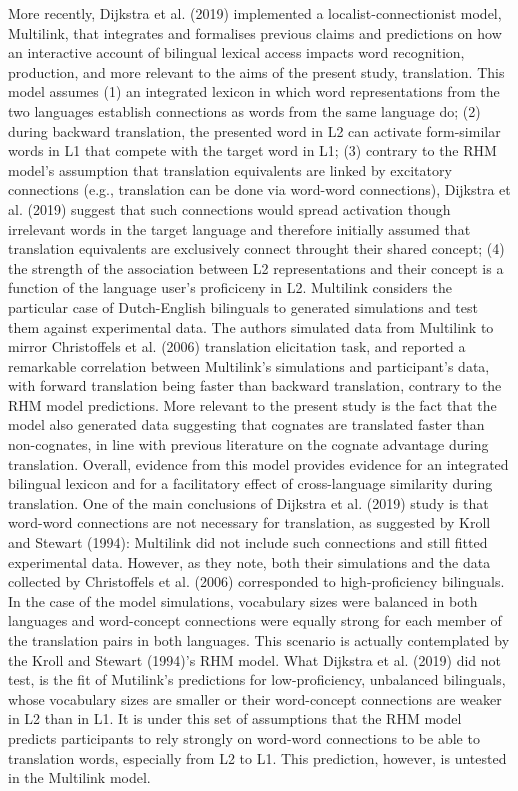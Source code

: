 \documentclass[
  english,
  man,floatsintext]{apa6}
\begin{document}
More recently, Dijkstra et al. (2019) implemented a localist-connectionist model, Multilink, that integrates and formalises previous claims and predictions on how an interactive account of bilingual lexical access impacts word recognition, production, and more relevant to the aims of the present study, translation. This model assumes (1) an integrated lexicon in which word representations from the two languages establish connections as words from the same language do; (2) during backward translation, the presented word in L2 can activate form-similar words in L1 that compete with the target word in L1; (3) contrary to the RHM model's assumption that translation equivalents are linked by excitatory connections (e.g., translation can be done via word-word connections), Dijkstra et al. (2019) suggest that such connections would spread activation though irrelevant words in the target language and therefore initially assumed that translation equivalents are exclusively connect throught their shared concept; (4) the strength of the association between L2 representations and their concept is a function of the language user's proficiceny in L2. Multilink considers the particular case of Dutch-English bilinguals to generated simulations and test them against experimental data. The authors simulated data from Multilink to mirror Christoffels et al. (2006) translation elicitation task, and reported a remarkable correlation between Multilink's simulations and participant's data, with forward translation being faster than backward translation, contrary to the RHM model predictions. More relevant to the present study is the fact that the model also generated data suggesting that cognates are translated faster than non-cognates, in line with previous literature on the cognate advantage during translation. Overall, evidence from this model provides evidence for an integrated bilingual lexicon and for a facilitatory effect of cross-language similarity during translation. One of the main conclusions of Dijkstra et al. (2019) study is that word-word connections are not necessary for translation, as suggested by Kroll and Stewart (1994): Multilink did not include such connections and still fitted experimental data. However, as they note, both their simulations and the data collected by Christoffels et al. (2006) corresponded to high-proficiency bilinguals. In the case of the model simulations, vocabulary sizes were balanced in both languages and word-concept connections were equally strong for each member of the translation pairs in both languages. This scenario is actually contemplated by the Kroll and Stewart (1994)'s RHM model. What Dijkstra et al. (2019) did not test, is the fit of Mutilink's predictions for low-proficiency, unbalanced bilinguals, whose vocabulary sizes are smaller or their word-concept connections are weaker in L2 than in L1. It is under this set of assumptions that the RHM model predicts participants to rely strongly on word-word connections to be able to translation words, especially from L2 to L1. This prediction, however, is untested in the Multilink model.
\end{document}
